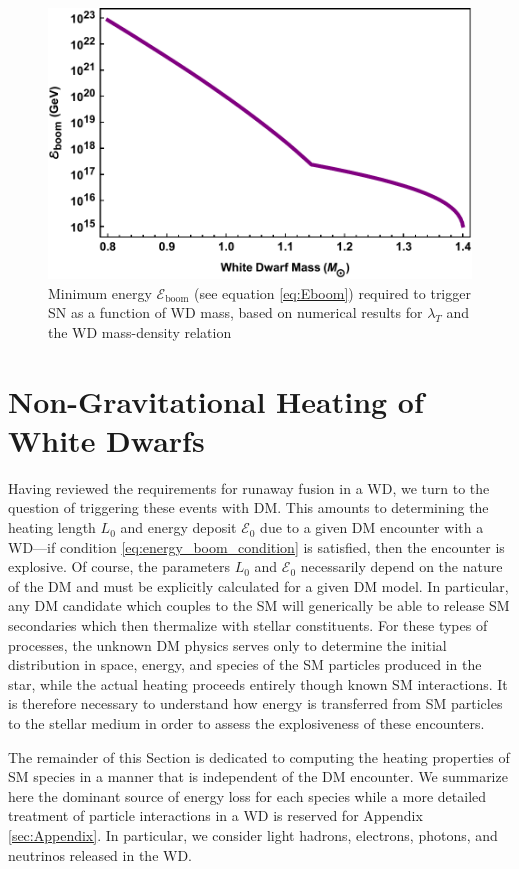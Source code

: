 \documentclass[twocolumn,preprintnumbers,amsmath,amssymb,prd, superscriptaddress]{revtex4} %
\newcommand{\Ez}{\mathcal{E}_0}
\newcommand{\Eboom}{\mathcal{E}_\text{boom}}
\begin{document}
\begin{figure}
\includegraphics[scale=.45]{Eboom.pdf}
\caption{Minimum energy $\Eboom$ (see equation \eqref{eq:Eboom}) required to trigger SN as a function of WD mass, based on numerical results for $\lambda_T$ \cite{Woosley} and the WD mass-density relation \cite{cococubed}}
\label{fig:Eboom}
\end{figure}

\section{Non-Gravitational Heating of White Dwarfs}
\label{sec:SMHeating}

Having reviewed the requirements for runaway fusion in a WD, we turn to the question of triggering these events with DM.
This amounts to determining the heating length $L_0$ and energy deposit $\Ez$ due to a given DM encounter with a WD---if condition \eqref{eq:energy_boom_condition} is satisfied, then the encounter is explosive.
Of course, the parameters $L_0$ and $\Ez$ necessarily depend on the nature of the DM and must be explicitly calculated for a given DM model.
In particular, any DM candidate which couples to the SM will generically be able to release SM secondaries which then thermalize with stellar constituents.
For these types of processes, the unknown DM physics serves only to determine the initial distribution in space, energy, and species of the SM particles produced in the star, while the actual heating proceeds entirely though known SM interactions.
It is therefore necessary to understand how energy is transferred from SM particles to the stellar medium in order to assess the explosiveness of these encounters.

The remainder of this Section is dedicated to computing the heating properties of SM species in a manner that is independent of the DM encounter.
We summarize here the dominant source of energy loss for each species while a more detailed treatment of particle interactions in a WD is reserved for Appendix \ref{sec:Appendix}. In particular, we consider light hadrons, electrons, photons, and neutrinos released in the WD.
\end{document}
